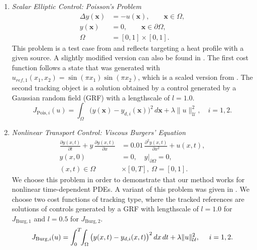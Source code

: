 \documentclass[final,1p,times]{elsarticle}
\theoremstyle{plain} %
\theoremstyle{definition} %
\theoremstyle{remark} %
\begin{document}
\begin{enumerate}
  \item \textit{Scalar Elliptic Control: Poisson's Problem}
    \begin{equation}\label{eq:poisson}
    \begin{aligned}
      \Delta y(\mathbf{x}) &= -u(\mathbf{x}), \qquad \mathbf{x}\in\Omega,\\
      y(\mathbf{x}) &= 0, \qquad \mathbf{x}\in\partial\Omega,\\
      \Omega &= [0,1]\times[0,1].
    \end{aligned}
    \end{equation}
This problem is a test case from \cite{Hwang2022} and reflects targeting a heat profile with a given source. A slightly modified version can also be found in \cite{Yong2024Deep}. The first cost function follows a state that was generated with $u_{ref,1}(x_1,x_2)=\sin(\pi x_1)\sin(\pi x_2)$, which is a scaled version from \cite{Hwang2022}. The second tracking object is a solution obtained by a control generated by a Gaussian random field (GRF) with a lengthscale of $l=1.0$.
\begin{equation}\label{cost:poisson}
    J_{\mathrm{Pois},i}(u) = \int_{\Omega} \big(y(\mathbf{x}) - y_{d,i}(\mathbf{x})\big)^2\,d\mathbf{x} + \lambda\|u\|^2_{\mathcal{U}},  \quad i=1,2.
  \end{equation}

  \item \textit{Nonlinear Transport Control: Viscous Burgers' Equation}
    \begin{equation}\label{eq:burgers}
    \begin{aligned}
    \frac{\partial y(x,t)}{\partial t} + y\,\frac{\partial y(x,t)}{\partial x}
    &= 0.01\,\frac{\partial^2 y(x,t)}{\partial x^2} + u(x,t),\\
    y(x,0) &= 0,\quad y|_{\partial\Omega}=0,\\
    (x,t) \in \Omega&\times[0,T],\ \Omega=[0,1].
    \end{aligned}
    \end{equation}
We choose this problem in order to demonstrate that our method works for nonlinear time-dependent PDEs. A variant of this problem was given in \cite{Hwang2022}. We choose two cost functions of tracking type, where the tracked references are solutions of controls generated by a GRF with lengthscale of $l=1.0$ for $J_{\mathrm{Burg},1}$ and $l=0.5$ for $J_{\mathrm{Burg},2}$.  
\begin{equation}\label{cost:burgers}
J_{\mathrm{Burg},i}(u)
= \int_0^T\!\!\int_{\Omega} \big(y(x,t) - y_{d,i}(x,t)\big)^2\,dx\,dt + \lambda \|u\|^2_{\mathcal{U}}, \quad \ i=1,2.\\
\end{equation}


\end{enumerate}
\end{document}
